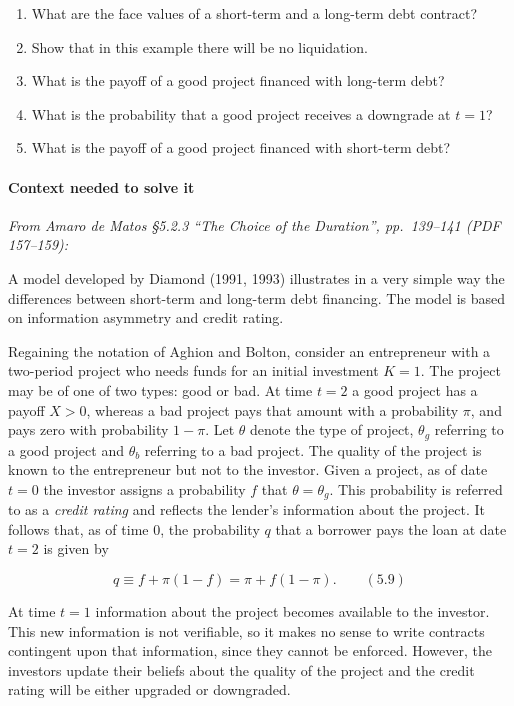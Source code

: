 \documentclass[11pt,a4paper]{article}
\begin{document}
\begin{enumerate}
\def\labelenumi{(\alph{enumi})}
\item
  What are the face values of a short-term and a long-term debt contract?
\item
  Show that in this example there will be no liquidation.
\item
  What is the payoff of a good project financed with long-term debt?
\item
  What is the probability that a good project receives a downgrade at \(t = 1\)?
\item
  What is the payoff of a good project financed with short-term debt?
\end{enumerate}

\paragraph{Context needed to solve it}

\emph{From Amaro de Matos §5.2.3 ``The Choice of the Duration'', pp.~139--141 (PDF 157--159):}

A model developed by Diamond (1991, 1993) illustrates in a very simple way the differences between
short-term and long-term debt financing. The model is based on information asymmetry and credit
rating.

Regaining the notation of Aghion and Bolton, consider an entrepreneur with a two-period project who
needs funds for an initial investment \(K = 1\). The project may be of one of two types: good or
bad. At time \(t = 2\) a good project has a payoff \(X > 0\), whereas a bad project pays that amount
with a probability \(\pi\), and pays zero with probability \(1 - \pi\). Let \(\theta\) denote the
type of project, \(\theta_g\) referring to a good project and \(\theta_b\) referring to a bad
project. The quality of the project is known to the entrepreneur but not to the investor. Given a
project, as of date \(t = 0\) the investor assigns a probability \(f\) that \(\theta = \theta_g\).
This probability is referred to as a \emph{credit rating} and reflects the lender's information
about the project. It follows that, as of time 0, the probability \(q\) that a borrower pays the
loan at date \(t = 2\) is given by

\[q \equiv f + \pi(1 - f) = \pi + f(1 - \pi). \qquad (5.9)\]

At time \(t = 1\) information about the project becomes available to the investor. This new
information is not verifiable, so it makes no sense to write contracts contingent upon that
information, since they cannot be enforced. However, the investors update their beliefs about the
quality of the project and the credit rating will be either upgraded or downgraded.
\end{document}

